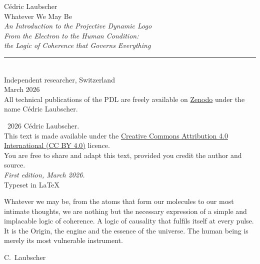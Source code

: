 \documentclass[12pt, a4paper, openright]{book}
\begin{document}
\begin{titlepage}
  \centering
  \vspace*{3cm}
  {\fontsize{11}{13}\selectfont Cédric Laubscher}\\[1.2cm]
  {\fontsize{30}{36}\selectfont\normalfont Whatever We May Be}\\[0.6cm]
  {\fontsize{16}{20}\selectfont\itshape
    An Introduction to the Projective Dynamic Logo}\\[0.4cm]
  {\fontsize{13}{16}\selectfont\itshape
    From the Electron to the Human Condition:\\
    the Logic of Coherence that Governs Everything}\\[3cm]
  \rule{0.45\textwidth}{0.4pt}\\[0.8cm]
  {\small Independent researcher, Switzerland}\\[0.3cm]
  {\small March 2026}\\[1.5cm]
  \vfill
  {\footnotesize
    All technical publications of the PDL are freely available on \href{https://zenodo.org}{Zenodo}
    under the name Cédric Laubscher.}
\end{titlepage}

\thispagestyle{empty}
\vspace*{\fill}
\begin{flushleft}
  \small
  \textcopyright\ 2026 Cédric Laubscher.\\[0.4em]
  This text is made available under the
  \href{https://creativecommons.org/licenses/by/4.0/}{%
    Creative Commons Attribution 4.0 International (CC BY 4.0)} licence.\\[0.4em]
  You are free to share and adapt this text,
  provided you credit the author and source.\\[1.2em]
  \textit{First edition, March 2026.}\\[0.4em]
  Typeset in \LaTeX\
\end{flushleft}
\vspace*{\fill}
\newpage

\thispagestyle{empty}
\vspace*{4cm}
\epigraph{%
  Whatever we may be, from the atoms that form our molecules to our most intimate thoughts, we are nothing but the necessary expression of a simple and implacable logic of coherence. A logic of causality that fulfils itself at every pulse. It is the Origin, the engine and the essence of the universe. The human being is merely its most vulnerable instrument.%
}{C.~Laubscher}
\newpage
\end{document}
